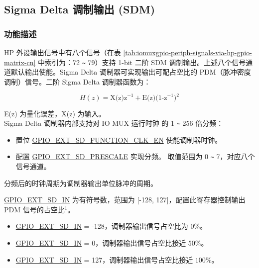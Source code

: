 \documentclass[main\_\_CN.tex]{subfiles}
\begin{document}
\subsection{Sigma Delta 调制输出 (SDM)}

\subsubsection{功能描述}

HP 外设输出信号中有八个信号（在表 \ref{tab:iomuxgpio-periph-signals-via-hp-gpio-matrix-cn} 中索引为：72 \verb+~+ 79）支持 1-bit 二阶 SDM 调制输出。上述八个信号通道默认输出使能。Sigma Delta 调制器可实现输出可配占空比的 PDM（脉冲密度调制）信号。二阶 Sigma Delta 调制器函数为：

\[
    H(z)=\textrm{X(z)z$^{-1}$} + \textrm{E(z)(1-z$^{-1}$)$^{2}$}
    \]

E(z) 为量化误差，X(z) 为输入。\\
Sigma Delta 调制器内部支持对 IO MUX 运行时钟 的 1 \verb+~+ 256 倍分频：
\begin{itemize}
    \item 置位 \hyperref[fielddesc:GPIOSDFUNCTIONCLKEN]{GPIO\_EXT\_SD\_FUNCTION\_CLK\_EN} 使能调制器时钟。
    \item 配置 \hyperref[fielddesc:GPIOSDSDNPRESCALE]{GPIO\_EXT\_SD\_PRESCALE} 实现分频。 取值范围为 0 \verb+~+ 7，对应八个信号通道。
\end{itemize}

分频后的时钟周期为调制器输出单位脉冲的周期。

\hyperref[fielddesc:GPIOSDSDNIN]{GPIO\_EXT\_SD\_IN} 为有符号数，范围为 [-128, 127]，配置此寄存器控制输出 PDM 信号的占空比$^{1}$。

\begin{itemize}
    \item \hyperref[fielddesc:GPIOSDSDNIN]{GPIO\_EXT\_SD\_IN} = -128，调制器输出信号占空比为 \begin{math}0\% \end{math}。
    \item \hyperref[fielddesc:GPIOSDSDNIN]{GPIO\_EXT\_SD\_IN} = 0，调制器输出信号占空比接近 \begin{math}50\% \end{math}。
    \item \hyperref[fielddesc:GPIOSDSDNIN]{GPIO\_EXT\_SD\_IN} = 127，调制器输出信号占空比接近 \begin{math}100\% \end{math}。
\end{itemize}
\end{document}
